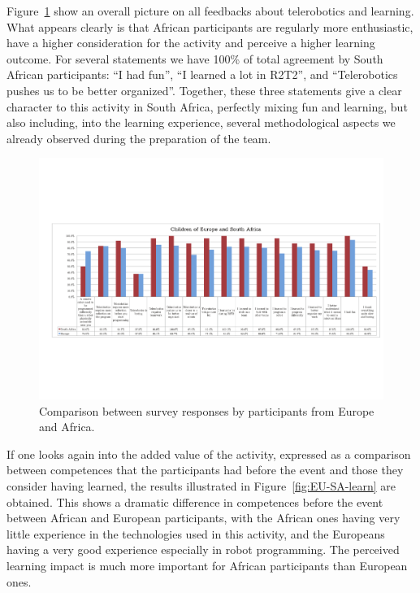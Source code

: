 \documentclass{intech-journal}
\begin{document}
Figure~\ref{fig:EU-SA} show an overall picture on all feedbacks about telerobotics and learning.
What appears clearly is that African participants are regularly more enthusiastic, have a higher consideration for the activity and perceive a higher learning outcome. 
For several statements we have 100\% of total agreement by South African participants: ``I had fun'', ``I learned a lot in R2T2'', and ``Telerobotics pushes us to be better organized''.
Together, these three statements give a clear character to this activity in South Africa, perfectly mixing fun and learning, but also including, into the learning experience, several methodological aspects we already observed during the preparation of the team. 

\begin{figure}[ht]
 \centering
    \includegraphics[width=\columnwidth]{figures/all-eu-sa.pdf}
  \caption{Comparison between survey responses by participants from Europe and Africa.}
  \label{fig:EU-SA} 
\end{figure}

If one looks again into the added value of the activity, expressed as a comparison between competences that the participants had before the event and those they consider having learned, the results illustrated in Figure~\ref{fig:EU-SA-learn} are obtained.
This shows a dramatic difference in competences before the event between African and European participants, with the African ones having very little experience in the technologies used in this activity, and the Europeans having a very good experience especially in robot programming. 
The perceived learning impact is much more important for African participants than European ones. 
\end{document}
